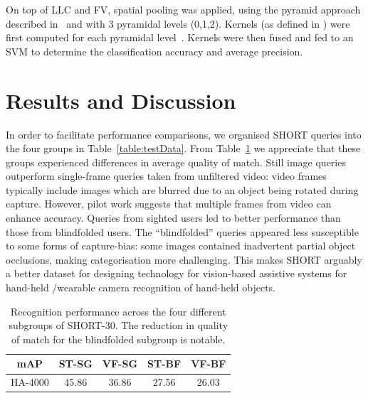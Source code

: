 On top of LLC and FV, spatial pooling was applied, using the pyramid approach described in~\cite{Lazebnik2006} and with 3 pyramidal levels (0,1,2). Kernels (as defined in \cite{Vedaldi2010}) were first computed for each pyramidal level~\cite{VanDeSande2010}. Kernels were then fused and fed to an SVM to determine the classification accuracy and average precision. 


\section{Results and Discussion} \label{sec:analysis} \label{sec:results}



In order to facilitate performance comparisons, we organised SHORT queries into the four groups in Table~\ref{table:testData}. From Table~\ref{table:sightedVSblindfolded} we appreciate that these groups experienced differences in average quality of match. Still image queries outperform single-frame queries taken from unfiltered video: video frames typically include images which are blurred due to an object being rotated during capture. However, pilot work suggests that multiple frames from video can enhance accuracy. Queries from sighted users led to better performance than those from blindfolded users. The ``blindfolded'' queries appeared less susceptible to some forms of  capture-bias: some images contained inadvertent partial object occlusions, making categorisation more challenging. This makes SHORT arguably a better dataset for designing technology for vision-based assistive systems for hand-held /wearable camera recognition of hand-held objects.


\begin{table}[]
\centering
  \begin{tabular}{ccccc}
   \toprule
    mAP & ST-SG & VF-SG & ST-BF & VF-BF \\
	\midrule
    HA-4000                    & 45.86    & 36.86   & 27.56 & 26.03\\
	\bottomrule
    \end{tabular}
    \caption{Recognition performance across the four different subgroups of SHORT-30. The reduction in quality of match for the blindfolded subgroup is notable.}
    \label{table:sightedVSblindfolded}
\end{table}


